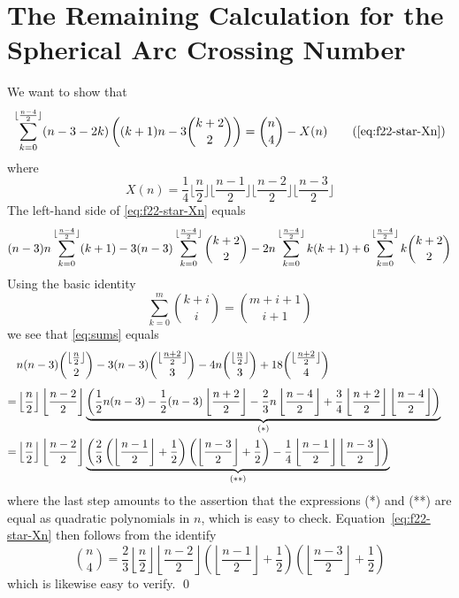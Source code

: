 \documentclass[11pt]{article}
\DeclarePairedDelimiter\floor{\lfloor}{\rfloor}
\begin{document}
\section{The Remaining Calculation for the Spherical Arc Crossing Number}
\label{sec:appendix-calculation}
We want to show that 
\begin{equation}
\sum_{k=0}^{\floor{\frac{n-4}{2}}} (n-3-2k)\left((k+1)n-3\binom{k+2}{2}\right)
=\binom{n}{4}-X(n)
\tag{\ref{eq:f22-star-Xn}}
\end{equation}
where 
\[
X(n)=\frac{1}{4}\Big\lfloor \frac{n}{2}\Big\rfloor \Big\lfloor \frac{n-1}{2} \Big\rfloor \Big\lfloor \frac{n-2}{2} \Big\rfloor \Big\lfloor \frac{n-3}{2}\Big\rfloor
\]
The left-hand side of \eqref{eq:f22-star-Xn} equals
\begin{equation}
\label{eq:sums}
(n-3)n\sum_{k=0}^{\floor{\frac{n-4}{2}}} (k+1) 
- 3(n-3)\sum_{k=0}^{\floor{\frac{n-4}{2}}} \binom{k+2}{2}
- 2n\sum_{k=0}^{\floor{\frac{n-4}{2}}} k(k+1) 
+ 6 \sum_{k=0}^{\floor{\frac{n-4}{2}}} k\binom{k+2}{2}
\end{equation}
Using the basic identity
\[ 
\sum_{k = 0}^m \binom{k+i}{i} = \binom{m+i+1}{i+1} 
\]
we see that \eqref{eq:sums} equals
\begin{eqnarray*}
& \displaystyle n(n-3) \binom{\floor{\frac{n}{2}}}{2} - 3 (n-3) \binom{\floor{\frac{n+2}{2}}}{3} - 4n \binom{\floor{\frac{n}{2}}}{3} + 18 \binom{\floor{\frac{n+2}{2}}}{4} & \\[1ex]
=& \displaystyle \left\lfloor \frac{n}{2} \right\rfloor \left\lfloor \frac{n-2}{2}\right\rfloor \underbrace{\left( \frac{1}{2} n(n-3) - \frac{1}{2} (n-3) \left\lfloor \frac{n+2}{2} \right\rfloor -\frac{2}{3}n \left\lfloor \frac{n-4}{2} \right \rfloor + \frac{3}{4} \left\lfloor \frac{n+2}{2} \right\rfloor \left\lfloor \frac{n-4}{2} \right\rfloor \right)}_{(*)}\\
= &  \displaystyle \left\lfloor \frac{n}{2} \right\rfloor \left\lfloor \frac{n-2}{2}\right\rfloor \underbrace{\left( \frac{2}{3} \left( \left\lfloor \frac{n-1}{2} \right\rfloor+ \frac{1}{2} \right) \left( \left\lfloor \frac{n-3}{2} \right\rfloor+ \frac{1}{2} \right) - \frac{1}{4} \left\lfloor \frac{n-1}{2} \right\rfloor \left\lfloor \frac{n-3}{2} \right\rfloor \right)}_{(**)}
\end{eqnarray*}
where the last step amounts to the assertion that the expressions (*) and (**) are equal as quadratic polynomials in $n$, which is easy to check. Equation~\eqref{eq:f22-star-Xn} then follows from the identify 
\[ 
\binom{n}{4} = \frac{2}{3}\left\lfloor \frac{n}{2} \right\rfloor \left\lfloor \frac{n-2}{2}\right\rfloor \left( \left\lfloor \frac{n-1}{2}\right\rfloor + \frac{1}{2} \right)  \left( \left\lfloor \frac{n-3}{2}\right\rfloor + \frac{1}{2} \right) 
\]
which is likewise easy to verify. \hfill \qed
%
%
%
%
\end{document}
